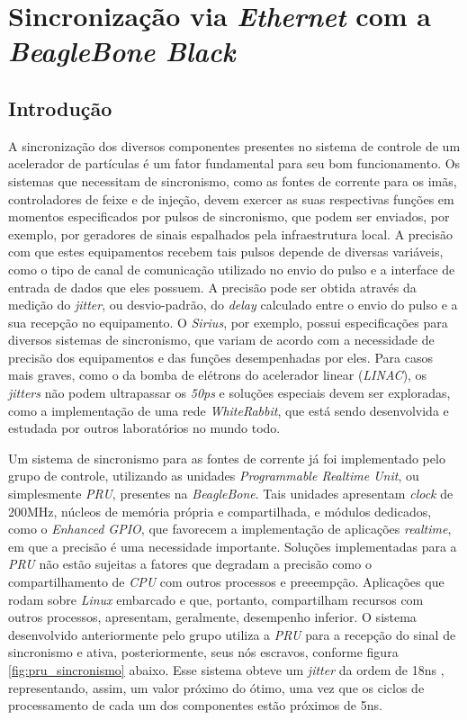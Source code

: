 \section {Sincronização via \textit{Ethernet} com a \textit{BeagleBone Black}}

\subsection {Introdução}

A sincronização dos diversos componentes presentes no sistema de controle de um
acelerador de partículas é um fator fundamental para seu bom funcionamento. Os
sistemas que necessitam de sincronismo, como as fontes de corrente para os imãs,
controladores de feixe e de injeção, devem exercer as suas
respectivas funções em momentos especificados por pulsos de sincronismo, que
podem ser enviados, por exemplo, por geradores de sinais espalhados pela
infraestrutura local. A precisão com que estes equipamentos recebem tais pulsos
depende de diversas variáveis, como o tipo de canal de comunicação
utilizado no envio do pulso e a interface de entrada de dados que eles possuem.
A precisão pode ser obtida através da medição do \textit{jitter}, ou
desvio-padrão, do \textit{delay} calculado entre o envio do pulso e a sua
recepção no equipamento.
O \textit{Sirius}, por exemplo, possui especificações para diversos sistemas de
sincronismo, que variam de acordo com a necessidade de precisão dos equipamentos
e das funções desempenhadas por eles. Para casos mais graves, como o da bomba de
elétrons do acelerador linear (\textit{LINAC}), os \textit{jitters} não podem
ultrapassar os \textit{50ps} e soluções especiais devem ser exploradas, como a
implementação de uma rede \textit{WhiteRabbit}, que está sendo
desenvolvida e estudada por outros laboratórios no mundo todo.

\vspace{12pt}

Um sistema de sincronismo para as fontes de corrente já
foi implementado pelo grupo de controle, utilizando as unidades
\textit{Programmable Realtime Unit}, ou simplesmente \textit{PRU}, presentes na
\textit{BeagleBone}. Tais unidades apresentam \textit{clock} de 200MHz,
núcleos de memória própria e compartilhada, e módulos dedicados, como o
\textit{Enhanced GPIO}, que favorecem a implementação de aplicações
\textit{realtime}, em que a precisão é uma necessidade importante. Soluções
implementadas para a \textit{PRU} não estão sujeitas a fatores que degradam a
precisão como o compartilhamento de \textit{CPU} com outros
processos e preeempção. Aplicações que rodam sobre \textit{Linux} embarcado e
que, portanto, compartilham recursos com outros processos, apresentam,
geralmente, desempenho inferior. O sistema desenvolvido anteriormente pelo grupo
utiliza a \textit{PRU} para a recepção do sinal de sincronismo e ativa, posteriormente, seus nós
escravos, conforme figura \ref{fig:pru_sincronismo} abaixo. Esse sistema obteve
um \textit{jitter} da ordem de 18ns \cite{pat}, representando, assim, um valor
próximo do ótimo, uma vez que os ciclos de processamento de cada um dos componentes estão
próximos de 5ns.


